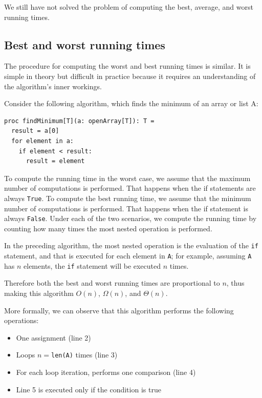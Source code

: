 \documentclass[justified, sixbynine]{tufte-book}
\def\ft{\small\tt}
\theoremstyle{plain}%
\newtheorem * {corollary}{Corollary}
\theoremstyle{definition}
\theoremstyle{remark}
\newtheorem * {remark}{Remark}
\newtheorem * {note}{Note}
\begin{document}
\begin{fullwidth}
We still have not solved the problem of computing the best, average, and worst running times.

\goodbreak\subsection{Best and worst running times}

The procedure for computing the worst and best running times is similar. It is simple in theory but difficult in practice because it requires an understanding of the algorithm's inner workings.

Consider the following algorithm, which finds the minimum of an array or list A:
\begin{lstlisting}
proc findMinimum[T](a: openArray[T]): T =
  result = a[0]
  for element in a:
    if element < result:
      result = element
\end{lstlisting}

To compute the running time in the worst case, we assume that the maximum number of computations is performed. That happens when the if statements are always {\ft True}. To compute the best running time, we assume that the minimum number of computations is performed. That happens when the if statement is always {\ft False}.
Under each of the two scenarios, we compute the running time by counting how many times the most nested operation is performed.

In the preceding algorithm, the most nested operation is the evaluation of the {\ft if} statement, and that is executed for each element in {\ft A}; for example, assuming {\ft A} has $n$ elements, the {\ft if} statement will be executed $n$ times.

Therefore both the best and worst running times are proportional to $n$, thus making this algorithm $O(n)$, $\Omega(n)$, and $\Theta(n)$.

More formally, we can observe that this algorithm performs the following operations:

\begin{itemize}
\item  One assignment (line 2)

\item  Loops $n=${\ft len(A)} times (line 3)

\item  For each loop iteration, performs one comparison (line 4)

\item  Line 5 is executed only if the condition is true
\end{itemize}


\end{fullwidth}
\end{document}
